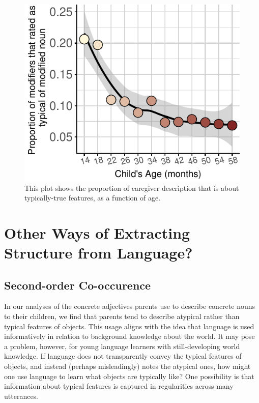 \documentclass[10pt, letterpaper]{article}
\newenvironment{CodeChunk}{}{}
\begin{document}
\begin{CodeChunk}
\begin{figure}[tb]

{\centering \includegraphics{figs/prototypical_plot-1} 

}

\caption[This plot shows the proportion of caregiver description that is about typically-true features, as a function of age]{This plot shows the proportion of caregiver description that is about typically-true features, as a function of age.}\label{fig:prototypical_plot}
\end{figure}
\end{CodeChunk}

\hypertarget{other-ways-of-extracting-structure-from-language}{%
\section{Other Ways of Extracting Structure from
Language?}\label{other-ways-of-extracting-structure-from-language}}

\hypertarget{second-order-co-occurence}{%
\subsection{Second-order Co-occurence}\label{second-order-co-occurence}}

In our analyses of the concrete adjectives parents use to describe
concrete nouns to their children, we find that parents tend to describe
atypical rather than typical features of objects. This usage aligns with
the idea that language is used informatively in relation to background
knowledge about the world. It may pose a problem, however, for young
language learners with still-developing world knowledge. If language
does not transparently convey the typical features of objects, and
instead (perhaps misleadingly) notes the atypical ones, how might one
use language to learn what objects are typically like? One possibility
is that information about typical features is captured in regularities
across many utterances.
\end{document}
